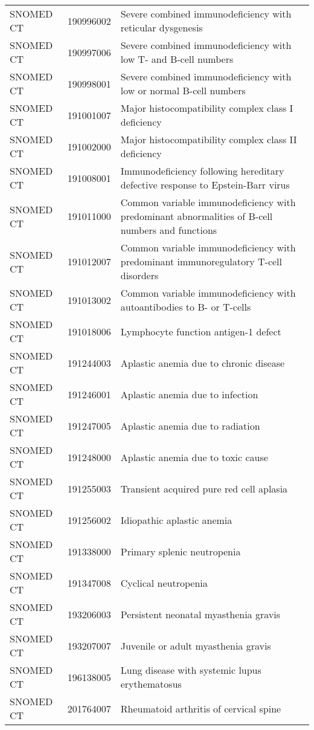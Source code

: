 \begin{longtable}{p{}p{}p{}}
  SNOMED CT & 190996002 & Severe combined immunodeficiency with reticular dysgenesis \\ 
  SNOMED CT & 190997006 & Severe combined immunodeficiency with low T- and B-cell numbers \\ 
  SNOMED CT & 190998001 & Severe combined immunodeficiency with low or normal B-cell numbers \\ 
  SNOMED CT & 191001007 & Major histocompatibility complex class I deficiency \\ 
  SNOMED CT & 191002000 & Major histocompatibility complex class II deficiency \\ 
  SNOMED CT & 191008001 & Immunodeficiency following hereditary defective response to Epstein-Barr virus \\ 
  SNOMED CT & 191011000 & Common variable immunodeficiency with predominant abnormalities of B-cell numbers and functions \\ 
  SNOMED CT & 191012007 & Common variable immunodeficiency with predominant immunoregulatory T-cell disorders \\ 
  SNOMED CT & 191013002 & Common variable immunodeficiency with autoantibodies to B- or T-cells \\ 
  SNOMED CT & 191018006 & Lymphocyte function antigen-1 defect \\ 
  SNOMED CT & 191244003 & Aplastic anemia due to chronic disease \\ 
  SNOMED CT & 191246001 & Aplastic anemia due to infection \\ 
  SNOMED CT & 191247005 & Aplastic anemia due to radiation \\ 
  SNOMED CT & 191248000 & Aplastic anemia due to toxic cause \\ 
  SNOMED CT & 191255003 & Transient acquired pure red cell aplasia \\ 
  SNOMED CT & 191256002 & Idiopathic aplastic anemia \\ 
  SNOMED CT & 191338000 & Primary splenic neutropenia \\ 
  SNOMED CT & 191347008 & Cyclical neutropenia \\ 
  SNOMED CT & 193206003 & Persistent neonatal myasthenia gravis \\ 
  SNOMED CT & 193207007 & Juvenile or adult myasthenia gravis \\ 
  SNOMED CT & 196138005 & Lung disease with systemic lupus erythematosus \\ 
  SNOMED CT & 201764007 & Rheumatoid arthritis of cervical spine \\ 

\end{longtable}
